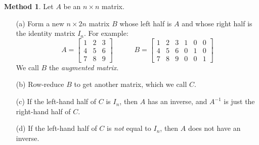 \documentclass[a4paper]{book}
\newcommand{\RED}[1]{{\color{red}#1}}
\newcommand{\PURPLE}[1]{{\color{purple}#1}}
\newcommand{\bbm}       {\begin{bmatrix}}
\newcommand{\ebm}       {\end{bmatrix}}
\newcommand{\tm}        {\times}
\renewcommand{\:}{\colon}
\newcommand{\EMPH}[1]{\RED{\emph{#1}}}
\newcommand{\DEFN}[1]{\PURPLE{\emph{#1}}}
\theoremstyle{definition}
\newtheorem{method}[theorem]{Method}
\begin{document}
\begin{method}
 Let $A$ be an $n\tm n$ matrix.
 \begin{itemize}
  \item[(a)] Form a new $n\tm 2n$ matrix $B$ whose left half is $A$
   and whose right half is the identity matrix $I_n$.  For example:
   {\small \[ A = \bbm 1&2&3 \\ 4&5&6 \\ 7&8&9 \ebm
              \hspace{3em}
              B = \left[\begin{array}{ccc|ccc}
                   1&2&3 & 1&0&0 \\
                   4&5&6 & 0&1&0 \\ 
                   7&8&9 & 0&0&1 
                  \end{array}\right]
   \]}
   We call $B$ the \DEFN{augmented matrix}.
  \item[(b)] Row-reduce $B$ to get another matrix, which we call $C$.
  \item[(c)] If the left-hand half of $C$ is $I_n$, then $A$ has an
   inverse, and $A^{-1}$ is just the right-hand half of $C$.
  \item[(d)] If the left-hand half of $C$ is \EMPH{not} equal to
   $I_n$, then $A$ does not have an inverse.
 \end{itemize}
\end{method}
\end{document}
